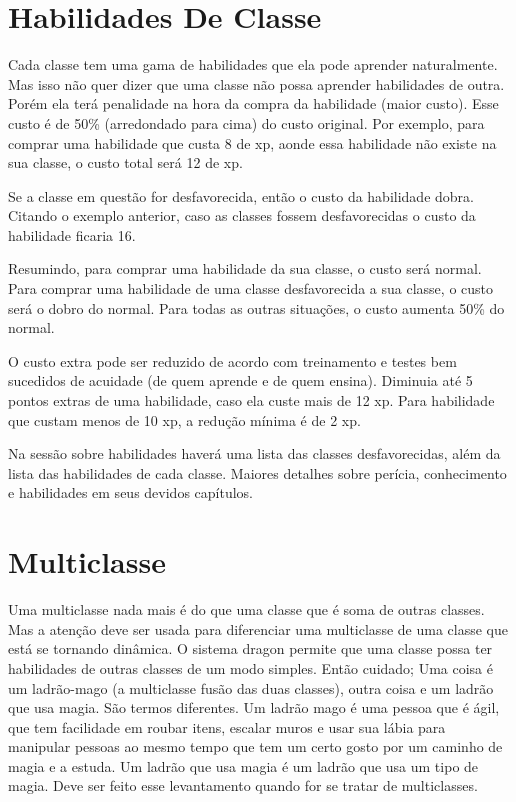 \section{Habilidades De Classe}

Cada classe tem uma gama de habilidades que ela pode aprender naturalmente. Mas isso não quer dizer que uma classe não possa aprender habilidades de outra. Porém ela terá penalidade na hora da compra da habilidade (maior custo). Esse custo é de 50\% (arredondado para cima) do custo original. Por exemplo, para comprar uma habilidade que custa 8 de xp, aonde essa habilidade não existe na sua classe, o custo total será 12 de xp. 

Se a classe em questão for desfavorecida, então o custo da habilidade dobra. Citando o exemplo anterior, caso as classes fossem desfavorecidas o custo da habilidade ficaria 16. 

Resumindo, para comprar uma habilidade da sua classe, o custo será normal. Para comprar uma habilidade de uma classe desfavorecida a sua classe, o custo será o dobro do normal. Para todas as outras situações, o custo aumenta 50\% do normal.

O custo extra pode ser reduzido de acordo com treinamento e testes bem sucedidos de acuidade (de quem aprende e de quem ensina). Diminuia até 5 pontos extras de uma habilidade, caso ela custe mais de 12 xp. Para habilidade que custam menos de 10 xp, a redução mínima é de 2 xp.

Na sessão sobre habilidades haverá uma lista das classes desfavorecidas, além da lista das habilidades de cada classe. Maiores detalhes sobre perícia, conhecimento e habilidades em seus devidos capítulos.


\section{Multiclasse}

Uma multiclasse nada mais é do que uma classe que é soma de outras classes. Mas a atenção deve ser usada para diferenciar uma multiclasse de uma classe que está se tornando dinâmica. O sistema dragon permite que uma classe possa ter habilidades de outras classes de um modo simples. Então cuidado; Uma coisa é um ladrão-mago (a multiclasse fusão das duas classes), outra coisa e um ladrão que usa magia. São termos diferentes. Um ladrão mago é uma pessoa que é ágil, que tem facilidade em roubar itens, escalar muros e usar sua lábia para manipular pessoas ao mesmo tempo que tem um certo gosto por um caminho de magia e a estuda. Um ladrão que usa magia é um ladrão que usa um tipo de magia. Deve ser feito esse levantamento quando for se tratar de multiclasses.      

